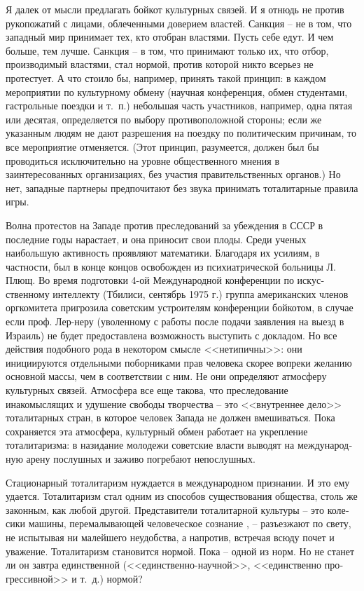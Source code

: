 \documentclass{book}
\begin{document}
Я далек от мысли предлагать бойкот культурных связей. И я отнюдь не против рукопожатий с лицами, облеченными доверием властей. Санкция -- не в том, что западный мир прини­мает тех, кто отобран властями. Пусть себе едут. И чем боль­ше, тем лучше. Санкция -- в том, что принимают только их, что отбор, производимый властями, стал нормой, против кото­рой никто всерьез не протестует. А что стоило бы, например, принять такой принцип: в каждом мероприятии по культур­ному обмену (научная конференция, обмен студентами, га­строльные поездки и т.~п.) небольшая часть участников, напри­мер, одна пятая или десятая, определяется по выбору проти­воположной стороны; если же указанным людям не дают раз­решения на поездку по политическим причинам, то все меро­приятие отменяется. (Этот принцип, разумеется, должен был бы проводиться исключительно на уровне общественного мне­ния в заинтересованных организациях, без участия правитель­ственных органов.) Но нет, западные партнеры предпочитают без звука принимать тоталитарные правила 
игры.

Волна протестов на Западе против преследований за убеж­дения в СССР в последние годы нарастает, и она приносит свои плоды. Среди ученых наибольшую активность проявляют мате­матики. Благодаря их усилиям, в частности, был в конце кон­цов освобожден из психиатрической больницы Л. Плющ. Во время подготовки 4-ой Международной конференции по искус­ственному интеллекту (Тбилиси, сентябрь 1975 г.) группа американских членов оргкомитета пригрозила советским уст­роителям конференции бойкотом, в случае если проф. Лер-неру (уволенному с работы после подачи заявления на выезд в Израиль) не будет предоставлена возможность выступить с докладом. Но все действия подобного рода в некотором смыс­ле <<нетипичны>>: они инициируются отдельными поборниками прав человека скорее вопреки желанию основной массы, чем в соответствии с ним. Не они определяют атмосферу культур­ных связей. Атмосфера все еще такова, что преследование инакомыслящих и удушение свободы творчества -- это <<внут­реннее дело>> тоталитарных стран, в которое человек 
Запада не должен вмешиваться. Пока сохраняется эта атмосфера, культурный обмен работает на укрепление тоталитаризма: в назидание молодежи советские власти выводят на международ­ную арену послушных и заживо погребают непослушных.

Стационарный тоталитаризм нуждается в международном признании. И это ему удается. Тоталитаризм стал одним из спо­собов существования общества, столь же законным, как лю­бой другой. Представители тоталитарной культуры -- это коле­сики машины, перемалывающей человеческое сознание , -- разъез­жают по свету, не испытывая ни малейшего неудобства, а на­против, встречая всюду почет и уважение. Тоталитаризм стано­вится нормой. Пока -- одной из норм. Но не станет ли он завт­ра единственной  (<<единственно-научной>>, <<единственно про­грессивной>> и т.~д.) нормой?
\end{document}
